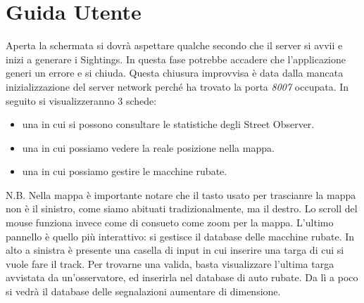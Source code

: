 \documentclass[a4paper,12pt]{report}
\begin{document}
\chapter{Guida Utente}
  
  Aperta la schermata si dovrà aspettare qualche secondo che il server si avvii 
e inizi a generare i Sightings. \newline
  In questa fase potrebbe accadere che l'applicazione generi un errore e si 
chiuda. 
Questa chiusura improvvisa è data dalla mancata inizializzazione del server 
network perché ha trovato la porta \textit{8007} occupata.
  In seguito si visualizzeranno 3 schede:
   \begin{itemize}
    \item una in cui si possono consultare le statistiche degli Street Observer.
    \item una in cui possiamo vedere la reale posizione nella mappa.
    \item una in cui possiamo gestire le macchine rubate.
   \end{itemize}
   
   N.B. Nella mappa è importante notare che il tasto usato per trascianre la 
mappa non è il sinistro, come siamo abituati tradizionalmente, ma il destro. Lo 
scroll del mouse funziona invece come di consueto come zoom per la mappa.
  \newline
  \newline
  L'ultimo pannello è quello più interattivo: si gestisce il database delle 
macchine rubate. In alto a sinistra è presente una casella di input in cui 
inserire una targa di cui si vuole fare il track. Per trovarne una valida, 
basta visualizzare l'ultima targa avvistata da un'osservatore, ed inserirla nel 
database di auto rubate. Da lì a poco si vedrà il database delle segnalazioni 
aumentare di dimensione.
\end{document}
